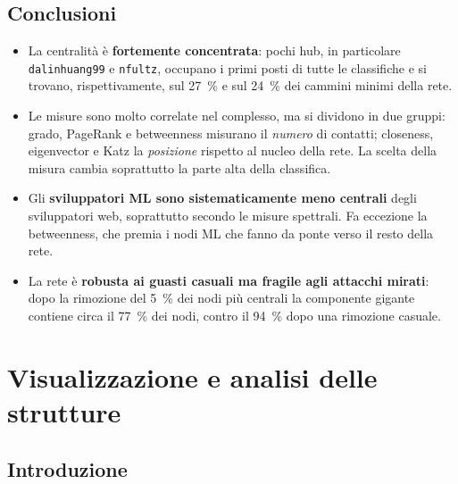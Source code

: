 \documentclass[11pt]{report}
\begin{document}
\section{Conclusioni}
\label{sec:ce_conclusioni}

\begin{itemize}
  \item La centralità è \textbf{fortemente concentrata}: pochi hub, in particolare
        \texttt{dalinhuang99} e \texttt{nfultz}, occupano i primi posti di tutte le
        classifiche e si trovano, rispettivamente, sul \SI{27}{\percent} e sul
        \SI{24}{\percent} dei cammini minimi della rete.
  \item Le misure sono molto correlate nel complesso, ma si dividono in due gruppi:
        grado, PageRank e betweenness misurano il \emph{numero} di contatti;
        closeness, eigenvector e Katz la \emph{posizione} rispetto al nucleo della
        rete. La scelta della misura cambia soprattutto la parte alta della
        classifica.
  \item Gli \textbf{sviluppatori ML sono sistematicamente meno centrali} degli
        sviluppatori web, soprattutto secondo le misure spettrali. Fa eccezione la
        betweenness, che premia i nodi ML che fanno da ponte verso il resto della
        rete.
  \item La rete è \textbf{robusta ai guasti casuali ma fragile agli attacchi
        mirati}: dopo la rimozione del \SI{5}{\percent} dei nodi più centrali la
        componente gigante contiene circa il \SI{77}{\percent} dei nodi, contro
        il \SI{94}{\percent} dopo una rimozione casuale.
\end{itemize}

\chapter{Visualizzazione e analisi delle strutture}
\label{cap:strutture}

\section{Introduzione}
\label{sec:st_intro}
\end{document}
